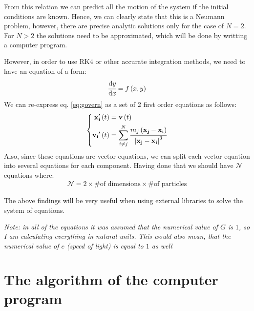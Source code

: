 \documentclass[
    draft,
    fontsize=11pt,
    DIV=calc
]{scrartcl}
\newcommand{\vect}[1]{\ensuremath{\mathrm{\mathbf{#1}}}}
\newcommand{\dd}{\ensuremath{\mathrm{d}}}
\begin{document}
From this relation we can predict all the motion of the system if the initial conditions are known.
%
Hence, we can clearly state that this is a Neumann problem, however, there are precise analytic solutions only for the case of $N=2$.
%
For $N>2$ the solutions need to be approximated, which will be done by writting a computer program.

%
However, in order to use RK4 or other accurate integration methods, we need to have an equation of a form:
%
\begin{align}
    \cfrac{\dd y}{\dd x} = f\left(x,y\right)
    \nonumber
\end{align}
%
We can re-express eq. \ref{eq:govern} as a set of 2 first order equations as follows:
%
\begin{align}
    \left\{
        \begin{aligned}
            \vect{x_i^\prime} \left( t \right)
            &=
            \vect{v} \left( t \right)
            \\
            \vect{v_i}^\prime \left( t \right)
            &=
            \sum_{i\ne j}^{N}{
                \cfrac{
                    m_j 
                    \left(
                        \vect{x_j} - \vect{x_i}
                    \right)
                }{
                    \left|
                        \vect{x_j} - \vect{x_i}
                    \right|^3
                }
            }
        \end{aligned}
    \right.
    \label{eq:govern-set}
\end{align}
%
Also, since these equations are vector equations, we can split each vector equation into several equations for each component.
%
Having done that we should have $\mathcal{N}$ equations where:
%
\begin{align}
    \mathcal{N} = 2 \times \text{\# of dimensions} \times \text{\# of particles}
\end{align}

%
The above findings will be very useful when using external libraries to solve the system of equations.

\emph{%
    Note: in all of the equations it was assumed that the numerical value of $G$ is $1$, so I am calculating everything in natural units.
    This would also mean, that the numerical value of $c$ (speed of light) is equal to $1$ as well
}

\section{The algorithm of the computer program}
\end{document}
